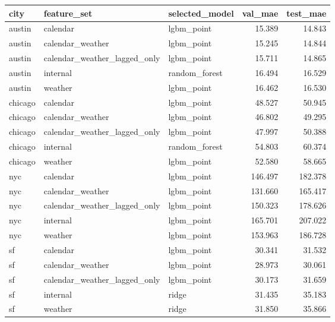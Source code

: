 \begin{tabular}{lllrr}
\toprule
city & feature\_set & selected\_model & val\_mae & test\_mae \\
\midrule
austin & calendar & lgbm\_point & 15.389 & 14.843 \\
austin & calendar\_weather & lgbm\_point & 15.245 & 14.844 \\
austin & calendar\_weather\_lagged\_only & lgbm\_point & 15.711 & 14.865 \\
austin & internal & random\_forest & 16.494 & 16.529 \\
austin & weather & lgbm\_point & 16.462 & 16.530 \\
chicago & calendar & lgbm\_point & 48.527 & 50.945 \\
chicago & calendar\_weather & lgbm\_point & 46.802 & 49.295 \\
chicago & calendar\_weather\_lagged\_only & lgbm\_point & 47.997 & 50.388 \\
chicago & internal & random\_forest & 54.803 & 60.374 \\
chicago & weather & lgbm\_point & 52.580 & 58.665 \\
nyc & calendar & lgbm\_point & 146.497 & 182.378 \\
nyc & calendar\_weather & lgbm\_point & 131.660 & 165.417 \\
nyc & calendar\_weather\_lagged\_only & lgbm\_point & 150.323 & 178.626 \\
nyc & internal & lgbm\_point & 165.701 & 207.022 \\
nyc & weather & lgbm\_point & 153.963 & 186.728 \\
sf & calendar & lgbm\_point & 30.341 & 31.532 \\
sf & calendar\_weather & lgbm\_point & 28.973 & 30.061 \\
sf & calendar\_weather\_lagged\_only & lgbm\_point & 30.173 & 31.659 \\
sf & internal & ridge & 31.435 & 35.183 \\
sf & weather & ridge & 31.850 & 35.866 \\
\bottomrule
\end{tabular}
